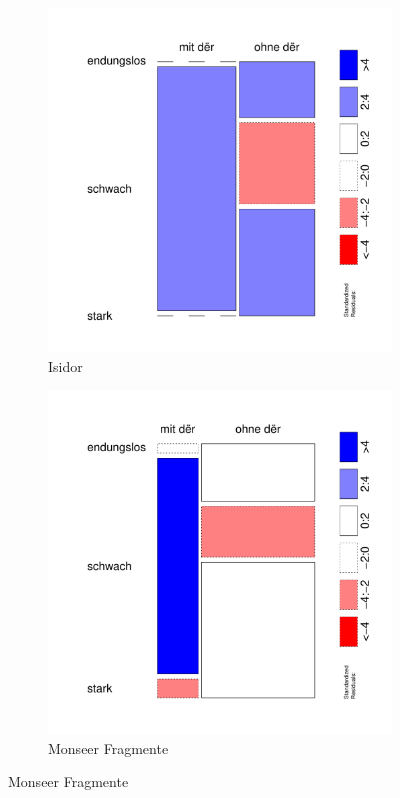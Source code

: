 \begin{figure}
\begin{subfigure}[b]{.5\linewidth}
  \includegraphics[height=.25\textheight]{generated/images/adjektive-I}
\caption {Isidor}
\end{subfigure}%
\begin{subfigure}[b]{.5\linewidth}
  \includegraphics[height=.25\textheight]{generated/images/adjektive-M}
\caption {Monseer Fragmente}
\end{subfigure}


\end{figure}
